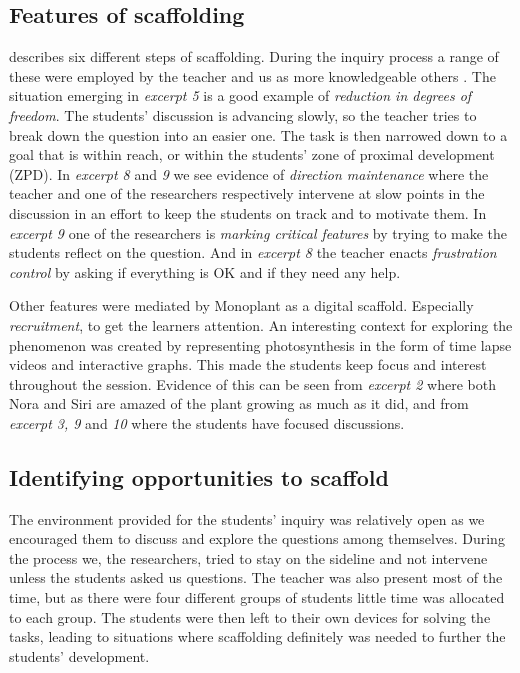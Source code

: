 \subsection{Features of scaffolding}
\citet{wood1976role} describes six different steps of scaffolding. During the inquiry process a range of these were employed by the teacher and us as more knowledgeable others \citep{vygotskiui1978mind}. The situation emerging in \emph{excerpt 5} is a good example of \emph{reduction in degrees of freedom}. The students' discussion is advancing slowly, so the teacher tries to break down the question into an easier one. The task is then narrowed down to a goal that is within reach, or within the students' zone of proximal development (ZPD). In \emph{excerpt 8} and \emph{9} we see evidence of \emph{direction maintenance} where the teacher and one of the researchers respectively intervene at slow points in the discussion in an effort to keep the students on track and to motivate them. In \emph{excerpt 9} one of the researchers is \emph{marking critical features} by trying to make the students reflect on the question. And in \emph{excerpt 8} the teacher enacts \emph{frustration control} by asking if everything is OK and if they need any help. 

Other features were mediated by Monoplant as a digital scaffold. Especially \emph{recruitment}, to get the learners attention. An interesting context for exploring the phenomenon was created by representing photosynthesis in the form of time lapse videos and interactive graphs. This made the students keep focus and interest throughout the session. Evidence of this can be seen from \emph{excerpt 2} where both Nora and Siri are amazed of the plant growing as much as it did, and from \emph{excerpt 3, 9} and \emph{10} where the students have focused discussions. 


\subsection{Identifying opportunities to scaffold}
The environment provided for the students' inquiry was relatively open as we encouraged them to discuss and explore the questions among themselves. During the process we, the researchers, tried to stay on the sideline and not intervene unless the students asked us questions. The teacher was also present most of the time, but as there were four different groups of students little time was allocated to each group. The students were then left to their own devices for solving the tasks, leading to situations where scaffolding definitely was needed to further the students' development. 

